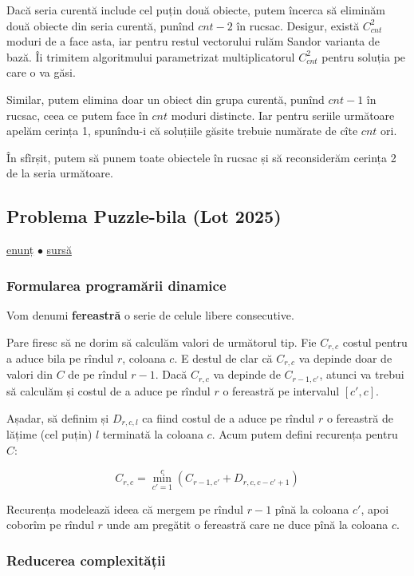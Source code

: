 \documentclass[../main.tex]{subfiles}
\begin{document}
Dacă seria curentă include cel puțin două obiecte, putem încerca să eliminăm două obiecte din seria curentă, punînd $cnt-2$ în rucsac. Desigur, există $C_{cnt}^2$ moduri de a face asta, iar pentru restul vectorului rulăm Sandor varianta de bază. Îi trimitem algoritmului parametrizat multiplicatorul $C_{cnt}^2$ pentru soluția pe care o va găsi.

Similar, putem elimina doar un obiect din grupa curentă, punînd $cnt-1$ în rucsac, ceea ce putem face în $cnt$ moduri distincte. Iar pentru seriile următoare apelăm cerința 1, spunîndu-i că soluțiile găsite trebuie numărate de cîte $cnt$ ori.

În sfîrșit, putem să punem toate obiectele în rucsac și să reconsiderăm cerința 2 de la seria următoare.

\subsection{Problema Puzzle-bila (Lot 2025)}
\label{problem:puzzle-bila}

\href{https://kilonova.ro/problems/3791}{enunț}
$\bullet$
\hyperref[code:puzzle-bila]{sursă}

\subsubsection*{Formularea programării dinamice}

Vom denumi \textbf{fereastră} o serie de celule libere consecutive.

Pare firesc să ne dorim să calculăm valori de următorul tip. Fie $C_{r,c}$ costul pentru a aduce bila pe rîndul $r$, coloana $c$. E destul de clar că $C_{r,c}$ va depinde doar de valori din $C$ de pe rîndul $r-1$. Dacă $C_{r,c}$ va depinde de $C_{r-1,c'}$, atunci va trebui să calculăm și costul de a aduce pe rîndul $r$ o fereastră pe intervalul $[c', c]$.

Așadar, să definim și $D_{r,c,l}$ ca fiind costul de a aduce pe rîndul $r$ o fereastră de lățime (cel puțin) $l$ terminată la coloana $c$. Acum putem defini recurența pentru $C$:

$$C_{r,c} = \min_{c'=1}^{c} (C_{r-1,c'} + D_{r,c,c-c'+1})$$

Recurența modelează ideea că mergem pe rîndul $r-1$ pînă la coloana $c'$, apoi coborîm pe rîndul $r$ unde am pregătit o fereastră care ne duce pînă la coloana $c$.

\subsubsection*{Reducerea complexității}
\end{document}
